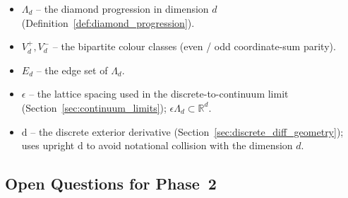 \begin{itemize}
\item $\Lambda_d$ -- the diamond progression in dimension $d$
      (Definition~\ref{def:diamond_progression}).
\item $V_d^+, V_d^-$ -- the bipartite colour classes (even / odd
      coordinate-sum parity).
\item $E_d$ -- the edge set of $\Lambda_d$.
\item $\epsilon$ -- the lattice spacing used in the
      discrete-to-continuum limit
      (Section~\ref{sec:continuum_limits}); $\epsilon \Lambda_d
      \subset \mathbb{R}^d$.
\item $\mathrm{d}$ -- the discrete exterior derivative
      (Section~\ref{sec:discrete_diff_geometry}); uses upright
      $\mathrm{d}$ to avoid notational collision with the
      dimension $d$.
\end{itemize}

\subsection{Open Questions for Phase~2}
\label{subsec:phase2_open}

